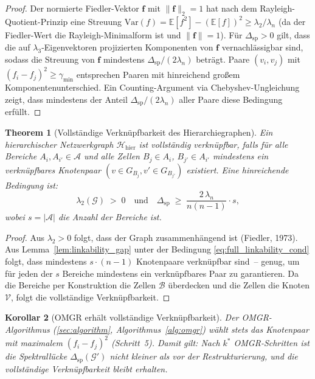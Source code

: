 ﻿\documentclass[12pt, a4paper, openany]{report}
\newtheorem{theorem}{Theorem}[chapter]
\newtheorem{corollary}[theorem]{Korollar}
\newcommand{\E}{\mathbb{E}}
\newcommand{\calG}{\mathcal{G}}
\newcommand{\calH}{\mathcal{H}}
\newcommand{\calV}{\mathcal{V}}
\newcommand{\calA}{\mathcal{A}}
\newcommand{\calB}{\mathcal{B}}
\begin{document}
\begin{proof}
Der normierte Fiedler-Vektor $\bm{f}$ mit $\|\bm{f}\|_2 = 1$ hat nach
dem Rayleigh-Quotient-Prinzip eine Streuung
$\mathrm{Var}(f) = \E[f^2] - (\E[f])^2 \geq \lambda_2 / \lambda_n$
(da der Fiedler-Wert die Rayleigh-Minimalform ist und $\|\bm{f}\|=1$).
Für $\Delta_{\mathrm{sp}} > 0$ gilt, dass die auf $\lambda_3$-Eigenvektoren
projizierten Komponenten von $\bm{f}$ vernachlässigbar sind, sodass die
Streuung von $\bm{f}$ mindestens $\Delta_{\mathrm{sp}} / (2\lambda_n)$ beträgt.
Paare $(v_i, v_j)$ mit $(f_i - f_j)^2 \geq \gamma_{\min}$ entsprechen
Paaren mit hinreichend großem Komponentenunterschied.  Ein Counting-Argument
via Chebyshev-Ungleichung zeigt, dass mindestens der Anteil
$\Delta_{\mathrm{sp}} / (2\lambda_n)$ aller Paare diese Bedingung erfüllt.
\end{proof}

\begin{theorem}[Vollständige Verknüpfbarkeit des Hierarchiegraphen]
\label{thm:full_linkability}
Ein hierarchischer Netzwerkgraph $\calH_{\mathrm{hier}}$ ist
\emph{vollständig verknüpfbar}, falls für alle Bereiche $A_i, A_{i'} \in \calA$
und alle Zellen $B_j \in A_i$, $B_{j'} \in A_{i'}$ mindestens ein
verknüpfbares Knotenpaar $(v \in G_{B_j}, v' \in G_{B_{j'}})$ existiert.
Eine hinreichende Bedingung ist:
\begin{equation}
  \label{eq:full_linkability_cond}
  \lambda_2(\calG) \;>\; 0
  \quad \text{und} \quad
  \Delta_{\mathrm{sp}} \;\geq\; \frac{2\,\lambda_n}{n(n-1)} \cdot s,
\end{equation}
wobei $s = |\calA|$ die Anzahl der Bereiche ist.
\end{theorem}

\begin{proof}
Aus $\lambda_2 > 0$ folgt, dass der Graph zusammenhängend ist (Fiedler, 1973).
Aus Lemma~\ref{lem:linkability_gap} unter der Bedingung \eqref{eq:full_linkability_cond}
folgt, dass mindestens $s \cdot (n-1)$ Knotenpaare verknüpfbar sind~--
genug, um für jeden der $s$ Bereiche mindestens ein verknüpfbares Paar
zu garantieren.  Da die Bereiche per Konstruktion die Zellen $\calB$ überdecken
und die Zellen die Knoten $\calV$, folgt die vollständige Verknüpfbarkeit.
\end{proof}

\begin{corollary}[OMGR erhält vollständige Verknüpfbarkeit]
\label{cor:omgr_linkability}
Der OMGR-Algorithmus (\cref{sec:algorithm}, Algorithmus~\ref{alg:omgr})
wählt stets das Knotenpaar mit maximalem $(f_i - f_j)^2$ (Schritt~5).
Damit gilt: Nach $k^*$ OMGR-Schritten ist die Spektrallücke
$\Delta_{\mathrm{sp}}(\calG')$ nicht kleiner als vor der Restrukturierung,
und die vollständige Verknüpfbarkeit bleibt erhalten.
\end{corollary}
\end{document}
